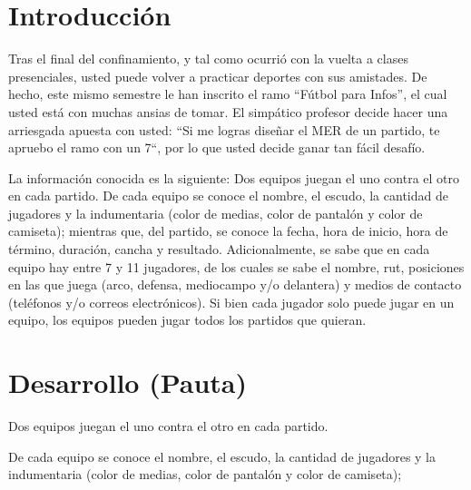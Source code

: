 \documentclass[letterpaper]{article}
\begin{document}
\section{Introducción}

Tras el final del confinamiento, y tal como ocurrió con la vuelta a clases presenciales, usted puede volver a practicar deportes con sus amistades. De hecho, este mismo semestre le han inscrito el ramo “Fútbol para Infos”, el cual usted está con muchas ansias de tomar. El simpático profesor decide hacer una arriesgada apuesta con usted: “Si me logras diseñar el MER de un partido, te apruebo el ramo con un 7“, por lo que usted decide ganar tan fácil desafío. 

La información conocida es la siguiente: Dos equipos juegan el uno contra el otro en cada partido. De cada equipo se conoce el nombre, el escudo, la cantidad de jugadores y la indumentaria (color de medias, color de pantalón y color de camiseta); mientras que, del partido, se conoce la fecha, hora de inicio, hora de término, duración, cancha y resultado. Adicionalmente, se sabe que en cada equipo hay entre 7 y 11 jugadores, de los cuales se sabe el nombre, rut, posiciones en las que juega (arco, defensa, mediocampo y/o delantera) y medios de contacto (teléfonos y/o correos electrónicos). Si bien cada jugador solo puede jugar en un equipo, los equipos pueden jugar todos los partidos que quieran.

\section{Desarrollo (Pauta)}

Dos equipos juegan el uno contra el otro en cada partido.
\begin{center}
\end{center}

De cada equipo se conoce el nombre, el escudo, la cantidad de jugadores y la indumentaria (color de medias, color de pantalón y color de camiseta); 
\end{document}
